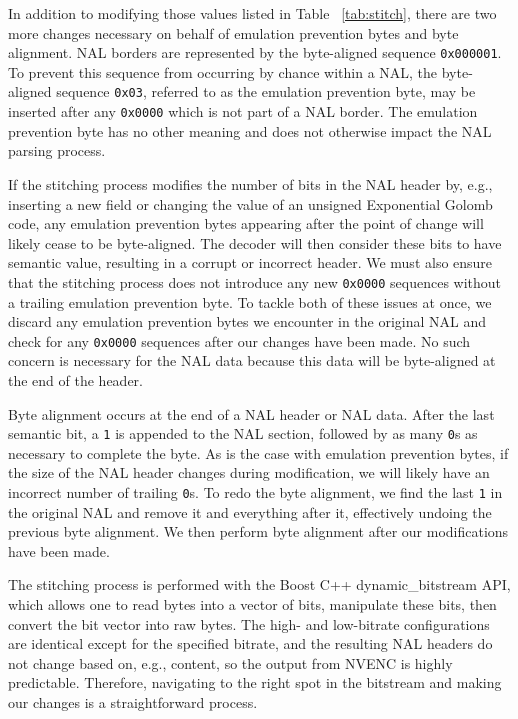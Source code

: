 In addition to modifying those values listed in Table ~\ref{tab:stitch}, there are two more changes necessary on behalf of emulation prevention bytes and byte alignment. NAL borders are represented by the byte-aligned sequence \texttt{0x000001}. To prevent this sequence from occurring by chance within a NAL, the byte-aligned sequence \texttt{0x03}, referred to as the emulation prevention byte, may be inserted after any \texttt{0x0000} which is not part of a NAL border. The emulation prevention byte has no other meaning and does not otherwise impact the NAL parsing process. 

If the stitching process modifies the number of bits in the NAL header by, e.g., inserting a new field or changing the value of an unsigned Exponential Golomb code, any emulation prevention bytes appearing after the point of change will likely cease to be byte-aligned. The decoder will then consider these bits to have semantic value, resulting in a corrupt or incorrect header. We must also ensure that the stitching process does not introduce any new \texttt{0x0000} sequences without a trailing emulation prevention byte. To tackle both of these issues at once, we discard any emulation prevention bytes we encounter in the original NAL and check for any \texttt{0x0000} sequences after our changes have been made. No such concern is necessary for the NAL data because this data will be byte-aligned at the end of the header.

Byte alignment occurs at the end of a NAL header or NAL data. After the last semantic bit, a \texttt{1} is appended to the NAL section, followed by as many \texttt{0}s as necessary to complete the byte. As is the case with emulation prevention bytes, if the size of the NAL header changes during modification, we will likely have an incorrect number of trailing \texttt{0}s. To redo the byte alignment, we find the last \texttt{1} in the original NAL and remove it and everything after it, effectively undoing the previous byte alignment. We then perform byte alignment after our modifications have been made.

The stitching process is performed with the Boost C++ dynamic\_bitstream API, which allows one to read bytes into a vector of bits, manipulate these bits, then convert the bit vector into raw bytes. The high- and low-bitrate configurations are identical except for the specified bitrate, and the resulting NAL headers do not change based on, e.g., content, so the output from NVENC is highly predictable. Therefore, navigating to the right spot in the bitstream and making our changes is a straightforward process.

